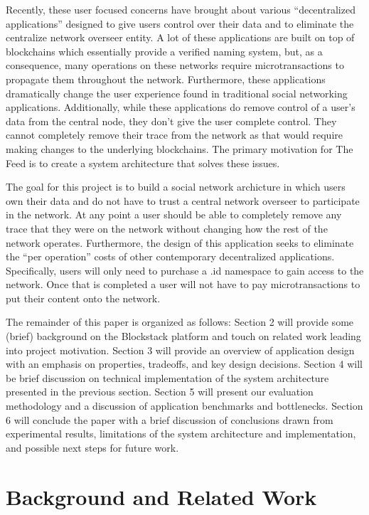 \documentclass[pageno]{jpaper}
\begin{document}
\begin{multicols*}{2}
Recently, these user focused concerns have brought about various “decentralized applications” designed to give users control over their data and to eliminate the centralize network overseer entity. A lot of these applications are built on top of blockchains which essentially provide a verified naming system, but, as a consequence, many operations on these networks require microtransactions to propagate them throughout the network. Furthermore, these applications dramatically change the user experience found in traditional social networking applications. Additionally, while these applications do remove control of a user’s data from the central node, they don’t give the user complete control. They cannot completely remove their trace from the network as that would require making changes to the underlying blockchains. The primary motivation for The Feed is to create a system architecture that solves these issues.\par
The goal for this project is to build a social network archicture in which users own their data and do not have to trust a central network overseer  to participate in the network. At any point a user should be able to completely remove any trace that they were on the network without changing how the rest of the network operates. Furthermore, the design of this application seeks to eliminate the “per operation” costs of other contemporary decentralized applications. Specifically, users will only need to purchase a .id namespace to gain access to the network. Once that is completed a user will not have to pay microtransactions to put their content onto the network.\par
The remainder of this paper is organized as follows: Section 2 will provide some (brief) background on the Blockstack platform and touch on related work leading into project motivation. Section 3 will provide an overview of application design with an emphasis on properties, tradeoffs, and key design decisions. Section 4 will be brief discussion on technical implementation of the system architecture presented in the previous section. Section 5 will present our evaluation methodology and a discussion of application benchmarks and bottlenecks. Section 6 will conclude the paper with a brief discussion of conclusions drawn from experimental results, limitations of the system architecture and implementation, and possible next steps for future work.

\section{Background and Related Work}
\label{section:background}


\end{multicols*}
\end{document}
